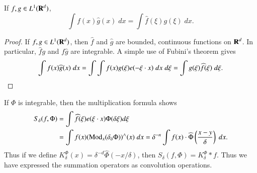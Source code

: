 \begin{theorem}
    If $f,g \in L^1(\operatorname{\mathbf{R}}^d)$,
    \[ \int f(x) \widehat{g}(x)\; dx = \int \widehat{f}(\xi) g(\xi)\; dx. \]
\end{theorem}
\begin{proof}
    If $f, g \in L^1(\operatorname{\mathbf{R}}^d)$, then $\widehat{f}$ and $\widehat{g}$ are bounded, continuous functions on $\operatorname{\mathbf{R}}^d$. In particular, $\widehat{f} g$ and $f \widehat{g}$ are integrable. A simple use of Fubini's theorem gives
    \[ \int f(x) \widehat{g}(x)\; dx = \int \int f(x) g(\xi) e(- \xi \cdot x)\; dx\; d\xi = \int g(\xi) \widehat{f}(\xi)\; d\xi. \qedhere \]
\end{proof}

If $\Phi$ is integrable, then the multiplication formula shows
%
\begin{align*}
    S_\delta(f,\Phi) &= \int \widehat{f}(\xi) e(\xi \cdot x) \Phi(\delta \xi) d\xi\\
    &= \int f(x) (\text{Mod}_x (\delta_\delta \Phi))^\wedge(x)\; dx = \delta^{-n} \int f(x) \cdot \widehat{\Phi} \left( \frac{x - y}{\delta} \right)\; dx.
\end{align*}
%
Thus if we define $K^\Phi_\delta(x) = \delta^{-d} \widehat{\Phi}(-x/\delta)$, then $S_\delta(f,\Phi) = K^\Phi_\delta * f$. Thus we have expressed the summation operators as convolution operations.

